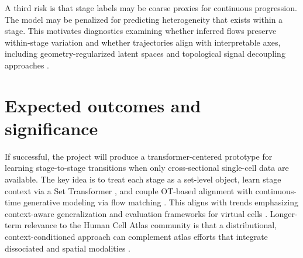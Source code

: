 \documentclass[conference]{IEEEtran}
\begin{document}
A third risk is that stage labels may be coarse proxies for continuous progression. The model may be penalized for predicting heterogeneity that exists within a stage. This motivates diagnostics examining whether inferred flows preserve within-stage variation and whether trajectories align with interpretable axes, including geometry-regularized latent spaces \cite{Palma2025-uk} and topological signal decoupling approaches \cite{Karin2023-sa}.

\section{Expected outcomes and significance}

If successful, the project will produce a transformer-centered prototype for learning stage-to-stage transitions when only cross-sectional single-cell data are available. The key idea is to treat each stage as a set-level object, learn stage context via a Set Transformer \cite{Lee2018-ya}, and couple OT-based alignment \cite{Bunne2024-pl,Cuturi2013-li} with continuous-time generative modeling via flow matching \cite{Lipman2022-ns}. This aligns with trends emphasizing context-aware generalization and evaluation frameworks for virtual cells \cite{Roohani2025-yb,Adduri2025-nt,Dong2026-fb}. Longer-term relevance to the Human Cell Atlas community is that a distributional, context-conditioned approach can complement atlas efforts that integrate dissociated and spatial modalities \cite{Tejada-Lapuerta2025-wz,Biancalani2021-bt,Kleshchevnikov2022-ki,Lopez2022-ps,Moriel2021-wu}.



\end{document}
